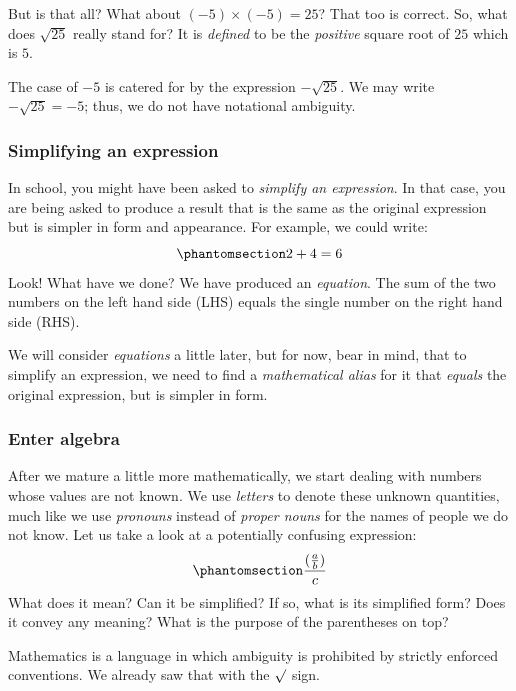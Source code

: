 \documentclass[
  a4paper,
]{article}
\begin{document}
But is that all? What about \((-5) \times (-5) = 25\)? That too is
correct. So, what does \(\sqrt{25}\) really stand for? It is
\emph{defined} to be the \emph{positive} square root of \(25\) which is
\(5\).

The case of \(-5\) is catered for by the expression \(-\sqrt{25}\). We
may write \(-\sqrt{25} = -5\); thus, we do not have notational
ambiguity.

\subsubsection{Simplifying an
expression}\label{simplifying-an-expression}

In school, you might have been asked to \emph{simplify an expression}.
In that case, you are being asked to produce a result that is the same
as the original expression but is simpler in form and appearance. For
example, we could write: \begin{equation}\phantomsection\label{eq:six}{
2 + 4 = 6
}\end{equation} Look! What have we done? We have produced an
\emph{equation}. The sum of the two numbers on the left hand side (LHS)
equals the single number on the right hand side (RHS).

We will consider \emph{equations} a little later, but for now, bear in
mind, that to simplify an expression, we need to find a
\emph{mathematical alias} for it that \emph{equals} the original
expression, but is simpler in form.

\subsubsection{Enter algebra}\label{enter-algebra}

After we mature a little more mathematically, we start dealing with
numbers whose values are not known. We use \emph{letters} to denote
these unknown quantities, much like we use \emph{pronouns} instead of
\emph{proper nouns} for the names of people we do not know. Let us take
a look at a potentially confusing expression:
\begin{equation}\phantomsection\label{eq:abc}{
\frac{(\frac{a}{b})}{c}
}\end{equation} What does it mean? Can it be simplified? If so, what is
its simplified form? Does it convey any meaning? What is the purpose of
the parentheses on top?

Mathematics is a language in which ambiguity is prohibited by strictly
enforced conventions. We already saw that with the \(\surd\) sign.
\end{document}
